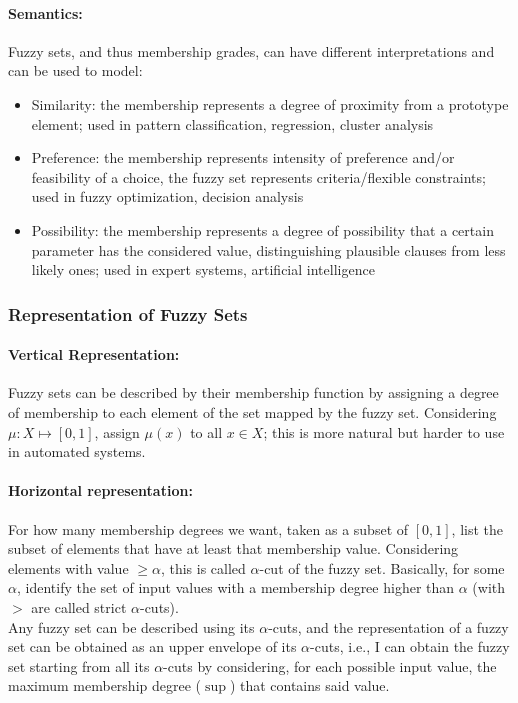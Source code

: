 \paragraph{Semantics:} Fuzzy sets, and thus membership grades, can have different interpretations and can be used to model:
\begin{itemize}
	\item Similarity: the membership represents a degree of proximity from a prototype element; used in pattern classification, regression, cluster analysis
	\item Preference: the membership represents intensity of preference and/or feasibility of a choice, the fuzzy set represents criteria/flexible constraints; used in fuzzy optimization, decision analysis
	\item Possibility: the membership represents a degree of possibility that a certain parameter has the considered value, distinguishing plausible clauses from less likely ones; used in expert systems, artificial intelligence
\end{itemize}

\subsubsection{Representation of Fuzzy Sets}
\paragraph{Vertical Representation:} Fuzzy sets can be described by their membership function by assigning a degree of membership to each element of the set mapped by the fuzzy set. Considering $\mu: X \mapsto [0,1]$, assign $\mu(x)$ to all $x \in X$; this is more natural but harder to use in automated systems.\\

\paragraph{Horizontal representation:} For how many membership degrees we want, taken as a subset of $[0,1]$, list the subset of elements that have at least that membership value. Considering elements with value $\geq \alpha$, this is called $\alpha$-cut of the fuzzy set. Basically, for some $\alpha$, identify the set of input values with a membership degree higher than $\alpha$ (with $>$ are called strict $\alpha$-cuts). \\

Any fuzzy set can be described using its $\alpha$-cuts, and the representation of a fuzzy set can be obtained as an upper envelope of its $\alpha$-cuts, i.e., I can obtain the fuzzy set starting from all its $\alpha$-cuts by considering, for each possible input value, the maximum membership degree ($\sup$) that contains said value.\\

